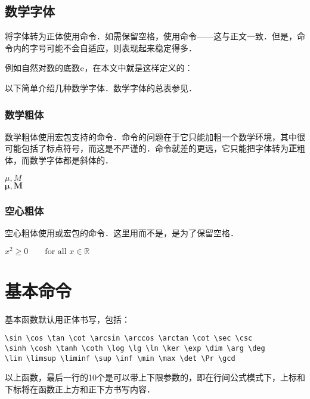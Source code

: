 \subsection{数学字体}
将字体转为正体使用命令．如需保留空格，使用命令——这与正文一致．但是，命令内的字号可能不会自适应，则表现起来稳定得多．

例如自然对数的底数$\ue$，在本文中就是这样定义的：
\begin{latex}
\newcommand{\ue}{\mathrm{e}}
\end{latex}

以下简单介绍几种数学字体．数学字体的总表参见．

\subsubsection{数学粗体}
数学粗体使用宏包支持的命令．命令的问题在于它只能加粗一个数学环境，其中很可能包括了标点符号，而这是不严谨的．命令就差的更远，它只能把字体转为\textbf{正}粗体，而数学字体都是斜体的．

\begin{codeshow}
$\mu,M$\\ $\boldsymbol{\mu},
\boldsymbol{M}$
\end{codeshow}

\subsubsection{空心粗体}
空心粗体使用或宏包的命令．这里用而不是，是为了保留空格．

\begin{codeshow}
$x^2 \geq 0 \qquad
\textrm{for all }x\in\mathbb{R}$
\end{codeshow}

\section{基本命令}
基本函数默认用正体书写，包括：
\begin{verbatim}
\sin \cos \tan \cot \arcsin \arccos \arctan \cot \sec \csc
\sinh \cosh \tanh \coth \log \lg \ln \ker \exp \dim \arg \deg 
\lim \limsup \liminf \sup \inf \min \max \det \Pr \gcd
\end{verbatim}

以上函数，最后一行的10个是可以带上下限参数的，即在行间公式模式下，上标和下标将在函数正上方和正下方书写内容．

